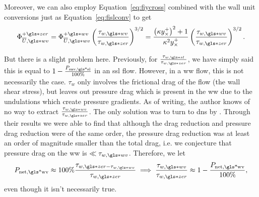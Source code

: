 Moreover, we can also employ Equation~\eqref{eq:fiycross} combined with the wall unit conversions just as Equation~\eqref{eq:fislconv} to get
\begin{equation}
	\Phi _{\overline{U},\gls*{wv}}\pz = \Phi _{\overline{U},\gls*{wv}}\pw \left( \frac{\tau_{w,\gls*{wv}}}{\tau_{w,\gls*{zer}}} \right) ^{3 /2 }=\frac{\left(  \kappa y_{\times}^{+}  \right) ^2+ 1}{\kappa^2 y_{\times}^{+}} \left(  \frac{\tau_{w,\gls*{wv}}}{\tau_{w,\gls*{zer}}} \right) ^{3 /2 } \label{eq:fiwwpzycr}
.\end{equation}

But there is a slight problem here. Previously, for $\frac{\tau_{w,\gls*{sl}}}{\tau_{w,\gls*{zer}}}$, we have simply said this is equal to $1-\frac{P_\text{sav,\gls*{sl}}}{100\%} $ in an \gls{ssl} flow. However, in a \gls{ww} flow, this is not necessarily the case. $\tau_w$ only involves the frictional drag of the flow (the wall shear stress), but leaves out pressure drag which is present in the  \gls{ww} due to the undulations which create pressure gradients. As of writing, the author knows of no way to extract $\frac{\tau_{w,\gls*{wv}}}{\tau_{w,\gls*{zer}}}$. The only solution was to turn to \gls{dns} by \sgt. Through their results we were able to find that although the drag reduction and pressure drag reduction were of the same order, the pressure drag reduction was at least an order of magnitude smaller than the total drag, i.e. we conjecture that pressure drag on the \gls{ww} is $\ll \tau_{w,\gls*{wv}}$. Therefore, we let
\begin{equation}
	P_\text{net,\gls*{wv}}\approx 100\% \frac{\tau_{w,\gls*{zer}-\tau_{w,\gls*{wv}}}}{\tau_{w,\gls*{zer}}} \implies  \frac{\tau_{w,\gls*{wv}}}{\tau_{w,\gls*{zer}}}\approx1-\frac{P_\text{net,\gls*{wv}} }{100\%}\label{eq:tauassump}
,\end{equation}
even though it isn't necessarily true.

